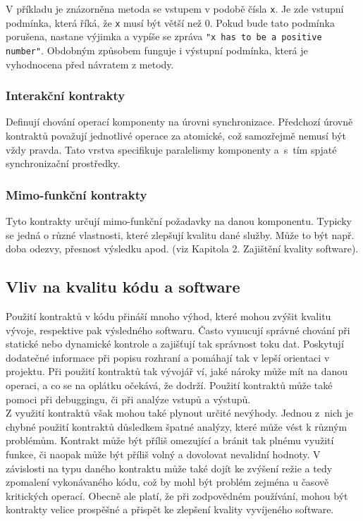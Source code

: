 			V příkladu je znázorněna metoda se vstupem v podobě čísla \texttt{x}. Je zde vstupní podmínka, která říká, že \texttt{x} musí být větší než 0. Pokud bude tato podmínka porušena, nastane výjimka a vypíše se zpráva \texttt{"x has to be a positive number"}. Obdobným způsobem funguje i výstupní podmínka, která je vyhodnocena před návratem z metody.
		
		\subsubsection{Interakční kontrakty}
			Definují chování operací komponenty na úrovni synchronizace. Předchozí úrovně kontraktů považují jednotlivé operace za atomické, což samozřejmě nemusí být vždy pravda. Tato vrstva specifikuje paralelismy komponenty a~s~tím spjaté synchronizační prostředky.
		
		\subsubsection{Mimo-funkční kontrakty}
			Tyto kontrakty určují mimo-funkční požadavky na danou komponentu. Typicky se jedná o různé vlastnosti, které zlepšují kvalitu dané služby. Může to být např. doba odezvy, přesnost výsledku apod. (viz Kapitola 2. Zajištění kvality software).
		
	\subsection{Vliv na kvalitu kódu a software}
		Použití kontraktů v kódu přináší mnoho výhod, které mohou zvýšit kvalitu vývoje, respektive pak výsledného softwaru. Často vynucují správné chování při statické nebo dynamické kontrole a zajišťují tak správnost toku dat. Poskytují dodatečné informace při popisu rozhraní a pomáhají tak v lepší orientaci v projektu. Při použití kontraktů tak vývojář ví, jaké nároky může mít na danou operaci, a co se na oplátku očekává, že dodrží. Použití kontraktů může také pomoci při debuggingu, či při analýze vstupů a výstupů.\\
		
		Z využití kontraktů však mohou také plynout určité nevýhody. Jednou z~nich je chybné použití kontraktů důsledkem špatné analýzy, které může vést k různým problémům. Kontrakt  může být příliš omezující a bránit tak plnému využití funkce, či naopak může být příliš volný a dovolovat nevalidní hodnoty. V závislosti na typu daného kontraktu může také dojít ke zvýšení režie a tedy zpomalení vykonávaného kódu, což by mohl být problém zejména u časově kritických operací. Obecně ale platí, že při zodpovědném používání, mohou být kontrakty velice prospěšné a přispět ke zlepšení kvality vyvíjeného software.


